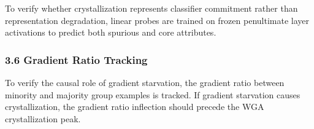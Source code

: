 To verify whether crystallization represents classifier commitment rather than representation degradation, linear probes are trained on frozen penultimate layer activations to predict both spurious and core attributes.

\subsubsection{3.6 Gradient Ratio Tracking}

To verify the causal role of gradient starvation, the gradient ratio between minority and majority group examples is tracked. If gradient starvation causes crystallization, the gradient ratio inflection should precede the WGA crystallization peak.

